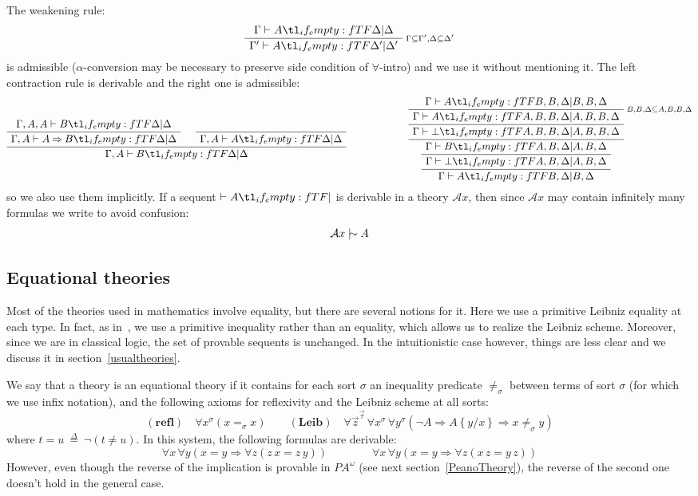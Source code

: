 \documentclass{CSML}
\newcommand*\ifpresent[3]{\tl_if_empty:fTF{#1}{#3}{#2}}
\newcommand*\AXM[1]{\AxiomC{$#1$}}
\newcommand*\UIM[1]{\UnaryInfC{$#1$}}
\newcommand*\BIM[1]{\BinaryInfC{$#1$}}
\newcommand*\RLM[1]{\RightLabel{$\scriptstyle#1$}}
\newcommand*\DP\DisplayProof
\newcommand*\Def{\mathrel{\overset{\Delta}{=}}}
\newcommand*\Entails{\mathrel{\vdash}}
\newcommand*\Derives{\mathrel{|\mkern-8.75mu\sim}}
\newcommand*\BarSep{\mathrel{|}}
\newcommand*\Sequent[3]{#1\Entails#2\ifpresent{#3}{\BarSep}{}#3}
\newcommand*\SortA{\sigma}
\newcommand*\SortB{\tau}
\newcommand*\LogSortedTerm[2]{#1^{#2}}
\newcommand*\LogTermA{t}
\newcommand*\LogTermB{u}
\newcommand*\LogVarA{x}
\newcommand*\LogVarB{y}
\newcommand*\LogVarC{z}
\newcommand*\LogImp{\mathbin{\Rightarrow}}
\newcommand*\LogBot\bot
\newcommand*\LogFormA{A}
\newcommand*\LogFormB{B}
\newcommand*\LogAxioms{\mathcal{A}x}
\newcommand*\LogSubst[1]{\left\{#1\right\}}
\newcommand*\PA{{P\!A}}
\newcommand*\PAom{{\PA^\omega}}
\newcommand*\CAAxName[1]{{\bm{\scriptstyle(#1)}}}
\newcommand*\CAReflName{\CAAxName{refl}}
\newcommand*\CARefl[1]{\forall\LogSortedTerm{\LogVarA}{#1}\left(\LogVarA=_#1\LogVarA\right)}
\newcommand*\CALeibName{\CAAxName{Leib}}
\newcommand*\CALeib[3]{\forall\LogSortedTerm{\vec{\LogVarC}}{\vec{#3}}\,\forall\LogSortedTerm{\LogVarA}{#1}\,\forall\LogSortedTerm{\LogVarB}{#1}\left(\neg#2\LogImp#2\LogSubst{\LogVarB/\LogVarA}\LogImp\LogVarA\neq_#1\LogVarB\right)}
\begin{document}
The weakening rule:
$$\AXM{\Sequent{\Gamma}{\LogFormA}{\Delta}}\RLM{\Gamma\subseteq\Gamma',\Delta\subseteq\Delta'}\UIM{\Sequent{\Gamma'}{\LogFormA}{\Delta'}}\DP$$
is admissible ($\alpha$-conversion may be necessary to preserve side condition of $\forall$-intro) and we use it without mentioning it. The left contraction rule is derivable and the right one is admissible:
$$\AXM{\Sequent{\Gamma,\LogFormA,\LogFormA}{\LogFormB}{\Delta}}\UIM{\Sequent{\Gamma,\LogFormA}{\LogFormA\LogImp\LogFormB}{\Delta}}\AXM{}\UIM{\Sequent{\Gamma,\LogFormA}{\LogFormA}{\Delta}}\BIM{\Sequent{\Gamma,\LogFormA}{\LogFormB}{\Delta}}\DP\qquad\qquad\qquad\AXM{\Sequent{\Gamma}{\LogFormA}{\LogFormB,\LogFormB,\Delta}}\RLM{\LogFormB,\LogFormB,\Delta\subseteq\LogFormA,\LogFormB,\LogFormB,\Delta}\UIM{\Sequent{\Gamma}{\LogFormA}{\LogFormA,\LogFormB,\LogFormB,\Delta}}\UIM{\Sequent{\Gamma}{\LogBot}{\LogFormA,\LogFormB,\LogFormB,\Delta}}\UIM{\Sequent{\Gamma}{\LogFormB}{\LogFormA,\LogFormB,\Delta}}\UIM{\Sequent{\Gamma}{\LogBot}{\LogFormA,\LogFormB,\Delta}}\UIM{\Sequent{\Gamma}{\LogFormA}{\LogFormB,\Delta}}\DP$$
so we also use them implicitly. If a sequent $\Sequent{}{\LogFormA}{}$ is derivable in a theory $\LogAxioms$, then since $\LogAxioms$ may contain infinitely many formulas we write to avoid confusion:
$$\LogAxioms\Derives\LogFormA$$
\subsection{Equational theories}
\label{equational}
Most of the theories used in mathematics involve equality, but there are several notions for it. Here we use a primitive Leibniz equality at each type. In fact, as in~\cite{KrivinePanoramas}, we use a primitive inequality rather than an equality, which allows us to realize the Leibniz scheme. Moreover, since we are in classical logic, the set of provable sequents is unchanged. In the intuitionistic case however, things are less clear and we discuss it in section~\ref{usualtheories}.\par
We say that a theory is an equational theory if it contains for each sort $\SortA$ an inequality predicate $\neq_\SortA$ between terms of sort $\SortA$ (for which we use infix notation), and the following axioms for reflexivity and the Leibniz scheme at all sorts:
$$\CAReflName\quad\CARefl{\SortA}\qquad\CALeibName\quad\CALeib{\SortA}{\LogFormA}{\SortB}$$
where $\LogTermA=\LogTermB\ \Def\ \neg\left(\LogTermA\neq\LogTermB\right)$. In this system, the following formulas are derivable:
$$\forall\LogVarA\,\forall\LogVarB\left(\LogVarA=\LogVarB\LogImp\forall\LogVarC\left(\LogVarC\,\LogVarA=\LogVarC\,\LogVarB\right)\right)\qquad\qquad\forall\LogVarA\,\forall\LogVarB\left(\LogVarA=\LogVarB\LogImp\forall\LogVarC\left(\LogVarA\,\LogVarC=\LogVarB\,\LogVarC\right)\right)$$
However, even though the reverse of the implication is provable in $\PAom$ (see next section~\ref{PeanoTheory}), the reverse of the second one doesn't hold in the general case.
\end{document}
